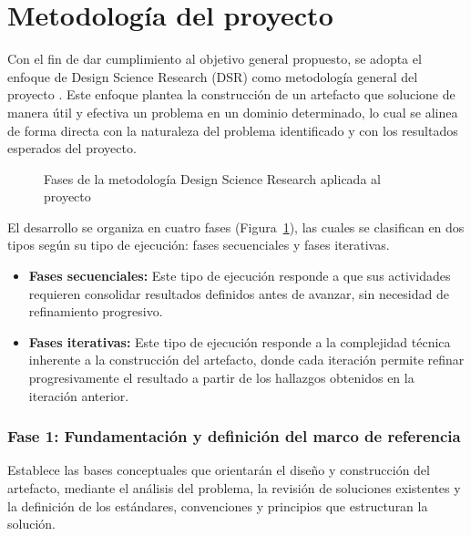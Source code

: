 
\section{Metodología del proyecto}

Con el fin de dar cumplimiento al objetivo general propuesto, se adopta el enfoque de Design Science Research (DSR) como metodología general del proyecto \citep{Wieringa2014}. Este enfoque plantea la construcción de un artefacto que solucione de manera útil y efectiva un problema en un dominio determinado, lo cual se alinea de forma directa con la naturaleza del problema identificado y con los resultados esperados del proyecto.

\begin{figure}[H]
  \scalebox{0.6}{}
  \caption{Fases de la metodología Design Science Research aplicada al proyecto}
  \label{fig:metodologia}
\end{figure}
\pagebreak

El desarrollo se organiza en cuatro fases (Figura~\ref{fig:metodologia}), las cuales se clasifican en dos tipos según su tipo de ejecución: fases secuenciales y fases iterativas.

\begin{itemize}
  \item \textbf{Fases secuenciales:} Este tipo de ejecución responde a que sus actividades requieren consolidar resultados definidos antes de avanzar, sin necesidad de refinamiento progresivo.

  \item \textbf{Fases iterativas:} Este tipo de ejecución responde a la complejidad técnica inherente a la construcción del artefacto, donde cada iteración permite refinar progresivamente el resultado a partir de los hallazgos obtenidos en la iteración anterior.
\end{itemize}

\subsubsection*{Fase 1: Fundamentación y definición del marco de referencia}

Establece las bases conceptuales que orientarán el diseño y construcción del artefacto, mediante el análisis del problema, la revisión de soluciones existentes y la definición de los estándares, convenciones y principios que estructuran la solución.

